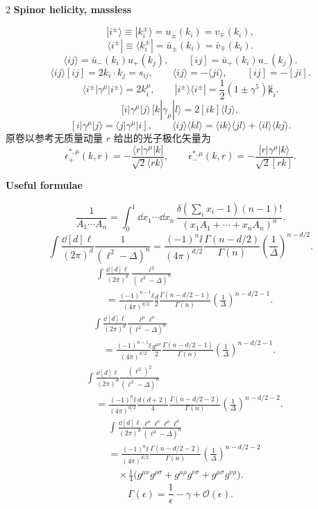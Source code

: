 \begin{multicols}{2}
\textbf{Spinor helicity, massless}

\[
|i^\pm\rangle\equiv|k_i^\pm\rangle
=u_\pm(k_i)=v_\mp(k_i),
\]
\[
\langle i^\pm|\equiv\langle k_i^\pm|
=\bar u_\pm(k_i)=\bar v_\mp(k_i).
\]
\[
\langle ij\rangle=\bar u_-(k_i)u_+(k_j),
\qquad
[ij]=\bar u_+(k_i)u_-(k_j).
\]
\[
\langle ij\rangle[ij]=2k_i\cdot k_j=s_{ij},
\qquad
\langle ij\rangle=-\langle ji\rangle,
\qquad [ij]=-[ji].
\]
\[
\langle i^\pm|\gamma^\mu|i^\pm\rangle=2k_i^\mu,
\qquad
|i^\pm\rangle\langle i^\pm|=\frac12(1\pm\gamma^5)\not k_i.
\]
\[
[i|\gamma^\mu|j\rangle\,[k|\gamma_\mu|l\rangle
=2[ik]\langle lj\rangle,
\]
\[
[i|\gamma^\mu|j\rangle=\langle j|\gamma^\mu|i],
\qquad
\langle ij\rangle\langle kl\rangle
=\langle ik\rangle\langle jl\rangle+\langle il\rangle\langle kj\rangle.
\]
原卷以参考无质量动量 $r$ 给出的光子极化矢量为
\[
\epsilon_+^{*,\mu}(k,r)
=-\frac{\langle r|\gamma^\mu|k]}{\sqrt2\langle rk\rangle},
\qquad
\epsilon_-^{*,\mu}(k,r)
=-\frac{[r|\gamma^\mu|k\rangle}{\sqrt2[rk]}.
\]

\columnbreak
\textbf{Useful formulae}

\[
\frac1{A_1\cdots A_n}
=\int_0^1\dd{x_1}\cdots\dd{x_n}\,
\frac{\delta(\sum_i x_i-1)(n-1)!}
{(x_1A_1+\cdots+x_nA_n)^n}.
\]
\[
\int\frac{\dd[d]{\ell}}{(2\pi)^d}\frac1{(\ell^2-\Delta)^n}
=\frac{(-1)^n\ii}{(4\pi)^{d/2}}
\frac{\Gamma(n-d/2)}{\Gamma(n)}
\left(\frac1\Delta\right)^{n-d/2}.
\]
\[
\begin{aligned}
&\int\frac{\dd[d]{\ell}}{(2\pi)^d}
\frac{\ell^2}{(\ell^2-\Delta)^n}\\
&\quad=\frac{(-1)^{n-1}\ii}{(4\pi)^{d/2}}\frac d2
\frac{\Gamma(n-d/2-1)}{\Gamma(n)}
\left(\frac1\Delta\right)^{n-d/2-1}.
\end{aligned}
\]
\[
\begin{aligned}
&\int\frac{\dd[d]{\ell}}{(2\pi)^d}
\frac{\ell^\mu\ell^\nu}{(\ell^2-\Delta)^n}\\
&\quad=\frac{(-1)^{n-1}\ii}{(4\pi)^{d/2}}\frac{g^{\mu\nu}}2
\frac{\Gamma(n-d/2-1)}{\Gamma(n)}
\left(\frac1\Delta\right)^{n-d/2-1}.
\end{aligned}
\]
\[
\begin{aligned}
&\int\frac{\dd[d]{\ell}}{(2\pi)^d}
\frac{(\ell^2)^2}{(\ell^2-\Delta)^n}\\
&\quad=\frac{(-1)^n\ii}{(4\pi)^{d/2}}\frac{d(d+2)}4
\frac{\Gamma(n-d/2-2)}{\Gamma(n)}
\left(\frac1\Delta\right)^{n-d/2-2}.
\end{aligned}
\]
\[
\begin{aligned}
&\int\frac{\dd[d]{\ell}}{(2\pi)^d}
\frac{\ell^\mu\ell^\nu\ell^\rho\ell^\sigma}{(\ell^2-\Delta)^n}\\
&=\frac{(-1)^n\ii}{(4\pi)^{d/2}}
\frac{\Gamma(n-d/2-2)}{\Gamma(n)}
\left(\frac1\Delta\right)^{n-d/2-2}\\
&\quad\times\frac14\bigl(g^{\mu\nu}g^{\rho\sigma}
+g^{\mu\rho}g^{\nu\sigma}+g^{\mu\sigma}g^{\nu\rho}\bigr).
\end{aligned}
\]
\[
\Gamma(\epsilon)=\frac1\epsilon-\gamma+\mathcal O(\epsilon).
\]


\end{multicols}
